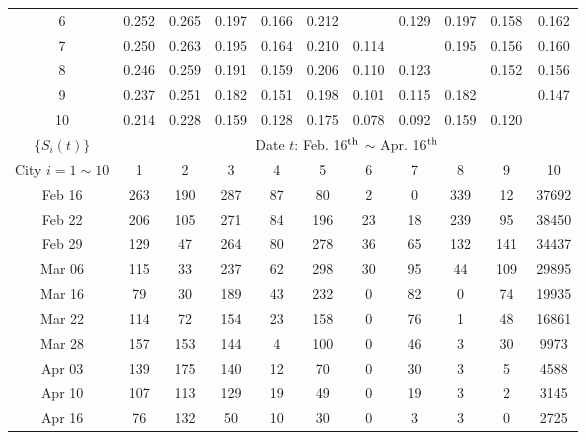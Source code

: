 \documentclass[11pt,twocolumn]{article}
\begin{document}
\begin{table*}[h]
\begin{tabular}{c|cccccccccc}
    6 & 0.252 & 0.265 & 0.197 & 0.166 & 0.212 &  & 0.129 & 0.197 & 0.158 & 0.162 \\ 
    7 & 0.250 & 0.263 & 0.195 & 0.164 & 0.210 & 0.114 &  & 0.195 & 0.156 & 0.160 \\ 
    8 & 0.246 & 0.259 & 0.191 & 0.159 & 0.206 & 0.110 & 0.123 &  & 0.152 & 0.156 \\ 
    9 & 0.237 & 0.251 & 0.182 & 0.151 & 0.198 & 0.101 & 0.115 & 0.182 &  & 0.147 \\ 
    10 & 0.214 & 0.228 & 0.159 & 0.128 & 0.175 & 0.078 & 0.092 & 0.159 & 0.120 &  \\ 
    \toprule
    \toprule
    $\{S_{i}(t)\}$ & \multicolumn{10}{c}{Date $t$: Feb. 16$^{\rm th}$ $\sim$ Apr. 16$^{\rm th}$} \\
    City $i=1\sim10$ & 1 & 2 & 3 & 4 & 5 & 6 & 7 & 8 & 9 & 10 \\ \hline
    Feb 16 & 263 & 190 & 287 & 87 & 80 & 2 & 0 & 339 & 12 & 37692   \\ 
    Feb 22 & 206 & 105 & 271 & 84 & 196 & 23 & 18 & 239 & 95 & 38450 \\ 
    Feb 29 & 129 & 47 & 264 & 80 & 278 & 36 & 65 & 132 & 141 & 34437 \\ 
    Mar 06 & 115 & 33 & 237 & 62 & 298 & 30 & 95 & 44 & 109 & 29895 \\ 
    Mar 16 & 79 & 30 & 189 & 43 & 232 & 0 & 82 & 0 & 74 & 19935 \\ 
    Mar 22 & 114 & 72 & 154 & 23 & 158 & 0 & 76 & 1 & 48 & 16861 \\ 
    Mar 28 & 157 & 153 & 144 & 4 & 100 & 0 & 46 & 3 & 30 & 9973 \\ 
    Apr 03 & 139 & 175 & 140 & 12 & 70 & 0 & 30 & 3 & 5 & 4588 \\ 
    Apr 10 & 107 & 113 & 129 & 19 & 49 & 0 & 19 & 3 & 2 & 3145 \\ 
    Apr 16 & 76 & 132 & 50 & 10 & 30 & 0 & 3 & 3 & 0 & 2725 \\ 
    \bottomrule
\end{tabular}
\end{table*}
\end{document}
